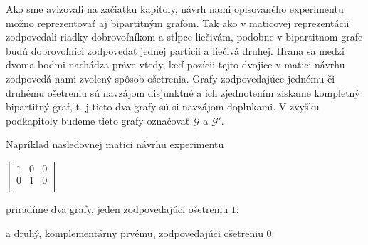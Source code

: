 Ako sme avizovali na začiatku kapitoly, návrh nami opisovaného experimentu možno reprezentovať aj bipartitným grafom.
Tak ako v maticovej reprezentácii zodpovedali riadky dobrovoľníkom a stĺpce liečivám, podobne v bipartitnom grafe budú dobrovoľníci 
zodpovedať jednej partícii a liečivá druhej. Hrana sa medzi dvoma bodmi nachádza práve vtedy, keď pozícii tejto dvojice v matici návrhu zodpovedá nami zvolený spôsob ošetrenia.
Grafy zodpovedajúce jednému či druhému ošetreniu sú navzájom disjunktné a ich zjednotením získame kompletný bipartitný graf, t. j tieto dva grafy sú si navzájom doplnkami.
V zvyšku podkapitoly budeme tieto grafy označovať $\mathcal{G}$ a $\mathcal{G}'$.

Napríklad nasledovnej matici návrhu experimentu

\begin{center}
$
\begin{bmatrix}
1 & 0 & 0 \\
0 & 1 & 0 \\
\end{bmatrix}
$
\end{center}

priradíme dva grafy, jeden zodpovedajúci ošetreniu $1$:

\begin{center}


\end{center}

a druhý, komplementárny prvému, zodpovedajúci ošetreniu $0$:

